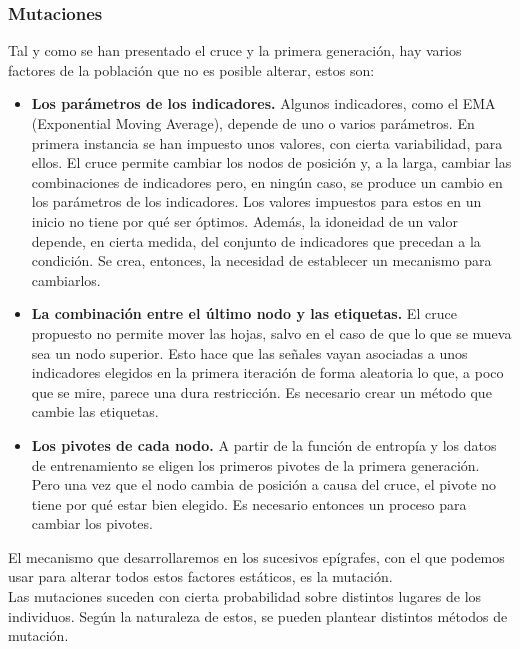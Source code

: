 \subsubsection{Mutaciones}
Tal y como se han presentado el cruce y la primera generaci\'on, hay varios factores de la poblaci\'on que no es posible alterar, estos son:\\

\begin{itemize}
    \item \textbf{Los par\'ametros de los indicadores.} Algunos indicadores, como el EMA (Exponential Moving Average), depende de uno o varios par\'ametros. En primera instancia se han impuesto unos valores, con cierta variabilidad, para ellos. El cruce permite cambiar los nodos de posici\'on y, a la larga, cambiar las combinaciones de indicadores pero, en ning\'un caso, se produce un cambio en los par\'ametros de los indicadores. Los valores impuestos para estos en un inicio no tiene por qu\'e ser \'optimos. Adem\'as, la idoneidad de un valor depende, en cierta medida, del conjunto de indicadores que precedan a la condici\'on. Se crea, entonces, la necesidad de establecer un mecanismo para cambiarlos.
    \item \textbf{La combinaci\'on entre el \'ultimo nodo y las etiquetas.} El cruce propuesto no permite mover las hojas, salvo en el caso de que lo que se mueva sea un nodo superior. Esto hace que las se\~nales vayan asociadas a unos indicadores elegidos en la primera iteraci\'on de forma aleatoria lo que, a poco que se mire, parece una dura restricci\'on. Es necesario crear un m\'etodo que cambie las etiquetas. 
    \item \textbf{Los pivotes de cada nodo.} A partir de la funci\'on de entrop\'ia y los datos de entrenamiento se eligen los primeros pivotes de la primera generaci\'on. Pero una vez que el nodo cambia de posici\'on a causa del cruce, el pivote no tiene por qu\'e estar bien elegido. Es necesario entonces un proceso para cambiar los pivotes.
\end{itemize}

 El mecanismo que desarrollaremos en los sucesivos ep\'igrafes, con el que podemos usar para alterar todos estos factores est\'aticos, es la mutaci\'on.\\
 
 Las mutaciones suceden con cierta probabilidad sobre distintos lugares de los individuos. Seg\'un la naturaleza de estos, se pueden plantear distintos m\'etodos de mutaci\'on.\\
 
